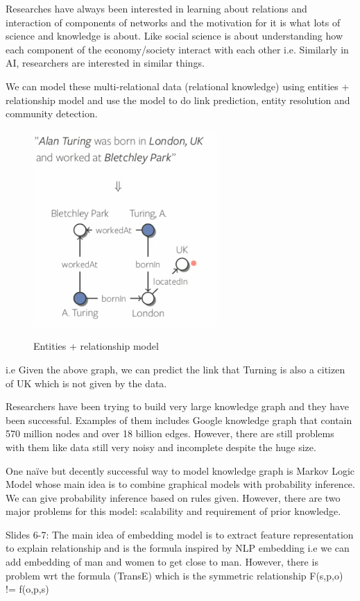 Researches have always been interested in learning about relations and interaction of components of networks and the motivation for it is what lots of science and knowledge is about. Like social science is about understanding how each component of the economy/society interact with each other i.e. Similarly in AI, researchers are interested in similar things. 

We can model these multi-relational data (relational knowledge) using entities + relationship model and use the model to do link prediction, entity resolution and community detection. 
\begin{figure}[htb!]
\centering
\includegraphics[width=0.5\linewidth]{lectures/11-a/slides2.PNG}
\label{fig:tag_overlap}
\caption{Entities + relationship model}
\end{figure}
i.e Given the above graph, we can predict the link that Turning is also a citizen of UK which is not given by the data.

Researchers have been trying to build very large knowledge graph and they have been successful. Examples of them includes Google knowledge graph that contain 570 million nodes and over 18 billion edges. However, there are still problems with them like data still very noisy and incomplete despite the huge size.

One naïve but decently successful way to model knowledge graph is Markov Logic Model whose main idea is to combine graphical models with probability inference. We can give probability inference based on rules given. However, there are two major problems for this model: scalability and requirement of prior knowledge.

Slides 6-7:
The main idea of embedding model is to extract feature representation to explain relationship and is the formula inspired by NLP embedding i.e we can add embedding of man and women to get close to man.
However, there is problem wrt the formula (TransE) which is the symmetric relationship
F(s,p,o) != f(o,p,s)

